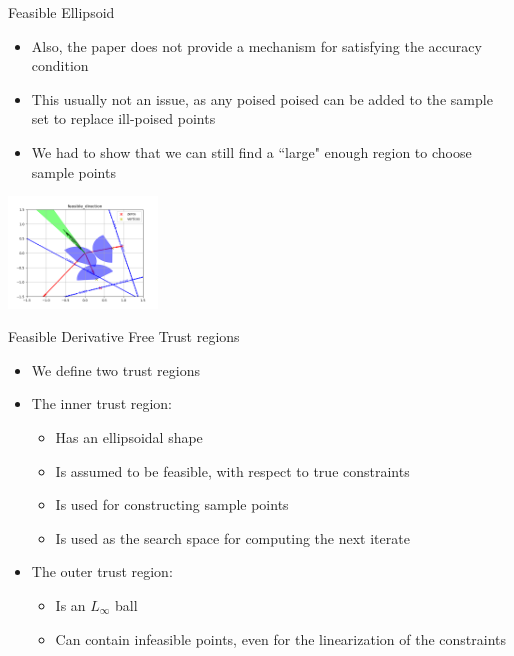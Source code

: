 \documentclass{beamer}
\begin{document}
\begin{frame}{Feasible Ellipsoid}
	\begin{itemize}
		\item Also, the paper does not provide a mechanism for satisfying the accuracy condition
		\item This usually not an issue, as any poised poised can be added to the sample set to replace ill-poised points
		\item We had to show that we can still find a ``large" enough region to choose sample points
	\end{itemize}
	\begin{center}
		\includegraphics[width=150px]{images/feasible_direction.png}
	\end{center}
\end{frame}


\begin{frame}{Feasible Derivative Free Trust regions}
    \begin{itemize}
        \item We define two trust regions
        \item The inner trust region:
            \begin{itemize}
                \item Has an ellipsoidal shape
                \item Is assumed to be feasible, with respect to true constraints
                \item Is used for constructing sample points
                \item Is used as the search space for computing the next iterate
            \end{itemize}
        \item The outer trust region:
            \begin{itemize}
                \item Is an $L_{\infty}$ ball
                \item Can contain infeasible points, even for the linearization of the constraints
            \end{itemize}
    \end{itemize}
\end{frame}
\end{document}

